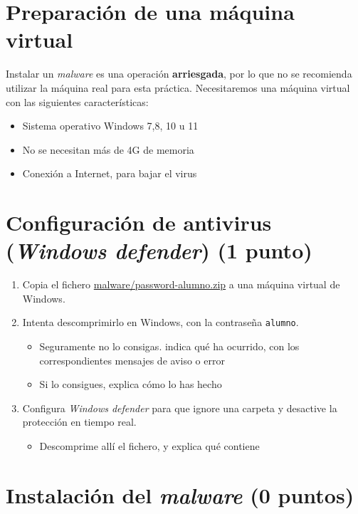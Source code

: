 \documentclass[a4paper]{article}
\begin{document}
\section*{Preparación de una máquina virtual}
\label{sec:org0000003}
Instalar un \emph{malware} es una operación \textbf{arriesgada}, por lo que no se recomienda utilizar la máquina real para esta práctica. Necesitaremos una máquina virtual con las siguientes características:
\begin{itemize}
\item Sistema operativo Windows 7,8, 10 u 11
\item No se necesitan más de 4G de memoria
\item Conexión a Internet, para bajar el virus
\end{itemize}
\section{Configuración de antivirus (\emph{Windows defender}) (1 punto)}
\label{sec:org0000006}
 \vspace{-4em}

\begin{enumerate}
\item Copia el fichero \href{malware/password-alumno.zip}{malware/password-alumno.zip} a una máquina virtual de Windows.
\item Intenta descomprimirlo en Windows, con la contraseña \texttt{alumno}.
\begin{itemize}
\item Seguramente no lo consigas. indica qué ha ocurrido, con los correspondientes mensajes de aviso o error
\item Si lo consigues, explica cómo lo has hecho
\end{itemize}
\item Configura \emph{Windows defender} para que ignore una carpeta y desactive la protección en tiempo real.
\begin{itemize}
\item Descomprime allí el fichero, y explica qué contiene
\end{itemize}
\end{enumerate}
\section{Instalación del \emph{malware} (0 puntos)}
\label{sec:org0000009}
 \vspace{-2em}
\end{document}
